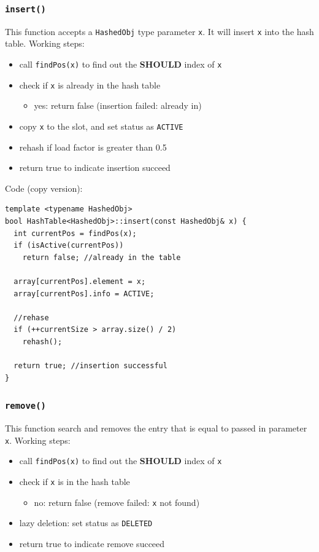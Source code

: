 \documentclass[12pt]{book}
\begin{document}
\subsubsection{\texttt{insert()}}
\label{sec:orgf1c5e33}
This function accepts a \texttt{HashedObj} type parameter \texttt{x}. It will insert \texttt{x} into the hash table. Working steps:
\begin{itemize}
\item call \texttt{findPos(x)} to find out the \textbf{SHOULD} index of \texttt{x}
\item check if \texttt{x} is already in the hash table
\begin{itemize}
\item yes: return false (insertion failed: already in)
\end{itemize}
\item copy \texttt{x} to the slot, and set status as \texttt{ACTIVE}
\item rehash if load factor is greater than 0.5
\item return true to indicate insertion succeed
\end{itemize}

Code (copy version):
\begin{verbatim}
template <typename HashedObj>
bool HashTable<HashedObj>::insert(const HashedObj& x) {
  int currentPos = findPos(x);
  if (isActive(currentPos))
    return false; //already in the table

  array[currentPos].element = x;
  array[currentPos].info = ACTIVE;

  //rehase 
  if (++currentSize > array.size() / 2)
    rehash();

  return true; //insertion successful
}
\end{verbatim}

\subsubsection{\texttt{remove()}}
\label{sec:orge435aa3}
This function search and removes the entry that is equal to passed in parameter \texttt{x}. Working steps:
\begin{itemize}
\item call \texttt{findPos(x)} to find out the \textbf{SHOULD} index of \texttt{x}
\item check if \texttt{x} is in the hash table
\begin{itemize}
\item no: return false (remove failed: \texttt{x} not found)
\end{itemize}
\item lazy deletion: set status as \texttt{DELETED}
\item return true to indicate remove succeed
\end{itemize}
\end{document}
